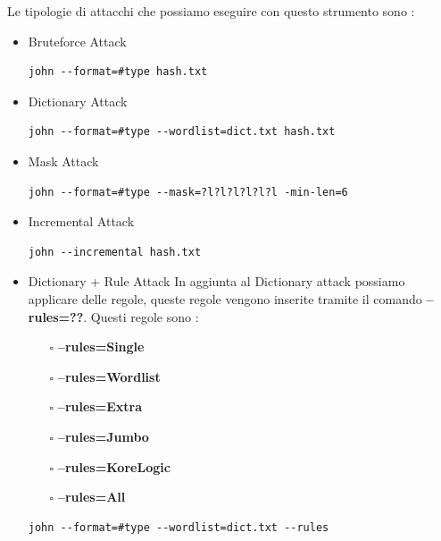 Le tipologie di attacchi che possiamo eseguire con questo strumento sono :
\begin{itemize}
    \item Bruteforce Attack \newline
    \begin{lstlisting}[caption={John the ripper Bruteforce}, style=javaScriptCode]
        john --format=#type hash.txt
    \end{lstlisting}
    \item Dictionary Attack \newline
    \begin{lstlisting}[caption={John the ripper Dictionary}, style=javaScriptCode]
        john --format=#type --wordlist=dict.txt hash.txt
    \end{lstlisting}
    \item Mask Attack \newline
    \begin{lstlisting}[caption={John the ripper Mask}, style=javaScriptCode]
        john --format=#type --mask=?l?l?l?l?l?l -min-len=6
    \end{lstlisting}
    \item Incremental Attack \newline
    \begin{lstlisting}[caption={John the ripper Incremental}, style=javaScriptCode]
        john --incremental hash.txt
    \end{lstlisting}
    \item Dictionary + Rule Attack \newline
    In aggiunta al Dictionary attack possiamo applicare delle regole, queste regole vengono inserite tramite il comando \textbf{--rules=??}.\newline
    Questi regole sono :
    \begin{itemize}
        \item[$\square$] \textbf{--rules=Single}
        \item[$\square$] \textbf{--rules=Wordlist}
        \item[$\square$] \textbf{--rules=Extra}
        \item[$\square$] \textbf{--rules=Jumbo}
        \item[$\square$] \textbf{--rules=KoreLogic}
        \item[$\square$] \textbf{--rules=All}
    \end{itemize}
    \begin{lstlisting}[caption={John the ripper Dictionary + Rule }, style=javaScriptCode]
        john --format=#type --wordlist=dict.txt --rules
    \end{lstlisting}
\end{itemize}

